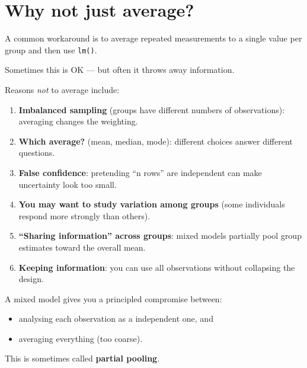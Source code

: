 \documentclass[
  letterpaper,
  8pt,
  a4paper]{book}
\providecommand{\tightlist}{%
  \setlength{\itemsep}{0pt}\setlength{\parskip}{0pt}}
\begin{document}
\section*{Why not just average?}\label{why-not-just-average}


A common workaround is to average repeated measurements to a single
value per group and then use \texttt{lm()}.

Sometimes this is OK --- but often it throws away information.

Reasons \emph{not} to average include:

\begin{enumerate}
\def\labelenumi{\arabic{enumi}.}
\tightlist
\item
  \textbf{Imbalanced sampling} (groups have different numbers of
  observations): averaging changes the weighting.
\item
  \textbf{Which average?} (mean, median, mode): different choices answer
  different questions.
\item
  \textbf{False confidence}: pretending ``n rows'' are independent can
  make uncertainty look too small.
\item
  \textbf{You may want to study variation among groups} (some
  individuals respond more strongly than others).
\item
  \textbf{``Sharing information'' across groups}: mixed models partially
  pool group estimates toward the overall mean.
\item
  \textbf{Keeping information}: you can use all observations without
  collapsing the design.
\end{enumerate}

\begin{tcolorbox}[enhanced jigsaw, arc=.35mm, bottomrule=.15mm, bottomtitle=1mm, breakable, colback=white, colbacktitle=quarto-callout-note-color!10!white, colframe=quarto-callout-note-color-frame, coltitle=black, left=2mm, leftrule=.75mm, opacityback=0, opacitybacktitle=0.6, rightrule=.15mm, title=\textcolor{quarto-callout-note-color}{\faInfo}\hspace{0.5em}{Note}, titlerule=0mm, toprule=.15mm, toptitle=1mm]

A mixed model gives you a principled compromise between:

\begin{itemize}
\tightlist
\item
  analysing each observation as a independent one, and
\item
  averaging everything (too coarse).
\end{itemize}

This is sometimes called \textbf{partial pooling}.

\end{tcolorbox}
\end{document}
